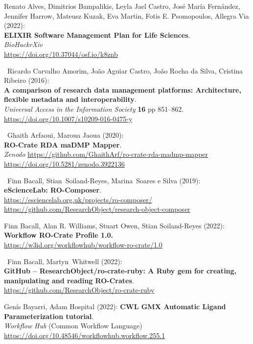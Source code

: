 \begin{thebibliography}{9}
 Renato Alves, Dimitrios Bampalikis, Leyla Jael Castro,
José María Fernández, Jennifer Harrow, Mateusz Kuzak, Eva Martin, Fotis
E. Psomopoulos, Allegra Via (2022):\\
\textbf{ELIXIR Software Management Plan for Life Sciences}.\\
\emph{BioHackrXiv}\\
\url{https://doi.org/10.37044/osf.io/k8znb}

~Ricardo Carvalho Amorim, João Aguiar Castro, João Rocha da
Silva, Cristina Ribeiro (2016):\\
\textbf{A comparison of research data management platforms:
Architecture, flexible metadata and interoperability}.\\
\emph{Universal Access in the Information Society} \textbf{16} pp
851--862.\\
\url{https://doi.org/10.1007/s10209-016-0475-y}

~Ghaith Arfaoui, Maroua Jaoua (2020):\\
\textbf{RO-Crate RDA maDMP Mapper}.\\
\emph{Zenodo}
\url{https://github.com/GhaithArf/ro-crate-rda-madmp-mapper}\\
\url{https://doi.org/10.5281/zenodo.3922136}

~Finn Bacall, Stian~Soiland-Reyes, Marina~Soares e Silva
(2019):\\
\textbf{eScienceLab: RO-Composer}.\\
\url{https://esciencelab.org.uk/projects/ro-composer/}~\\
\url{https://github.com/ResearchObject/research-object-composer}

 Finn Bacall, Alan R. Williams, Stuart Owen, Stian
Soiland-Reyes (2022):\\
\textbf{Workflow RO-Crate Profile 1.0.}\\
\url{https://w3id.org/workflowhub/workflow-ro-crate/1.0}

~Finn Bacall, Martyn~Whitwell (2022):\\
\textbf{GitHub -- ResearchObject/ro-crate-ruby: A Ruby gem for creating,
manipulating and reading RO-Crates}.\\
\url{https://github.com/ResearchObject/ro-crate-ruby}

 Genís Bayarri, Adam Hospital (2022): \textbf{CWL GMX
Automatic Ligand Parameterization tutorial}.\\
\emph{Workflow Hub} (Common Workflow Language)\\
\url{https://doi.org/10.48546/workflowhub.workflow.255.1}


\end{thebibliography}
